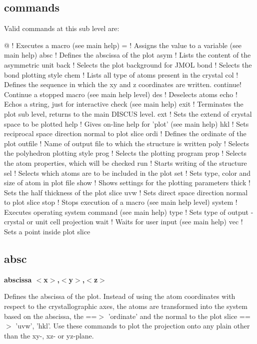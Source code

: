 \subsection*{commands}
Valid commands at this sub level are: 
\par
\begin{MacVerbatim}
@       ! Executes a macro (see main help)
=       ! Assigns the value to a variable (see main help)
absc    ! Defines the abscissa of the plot
asym    ! Lists the content of the asymmetric unit
back    ! Selects the plot background for JMOL
bond    ! Selects the bond plotting style
chem    ! Lists all type of atoms present in the crystal
col     ! Defines the sequence in which the xy and z coordinates are written.
continue! Continue a stopped macro (see main help level)
des     ! Deselects atoms
echo    ! Echos a string, just for interactive check (see main help)
exit    ! Terminates the plot sub level, returns to the main DISCUS level.
ext     ! Sets the extend of crystal space to be plotted
help    ! Gives on-line help for 'plot' (see main help)
hkl     ! Sets reciprocal space direction normal to plot slice
ordi    ! Defines the ordinate of the plot
outfile ! Name of output file to which the structure is written
poly    ! Selects the polyhedron plotting style
prog    ! Selects the plotting program
prop    ! Selects the atom properties, which will be checked
run     ! Starts writing of the structure
sel     ! Selects which atoms are to be included in the plot
set     ! Sets type, color and size of atom in plot file
show    ! Shows settings for the plotting parameters
thick   ! Sets the half thickness of the plot slice
uvw     ! Sets direct space direction normal to plot slice
stop    ! Stops execution of a macro (see main help level)
system  ! Executes operating system command (see main help)
type    ! Sets type of output - crystal or unit cell projection
wait    ! Waits for user input (see main help)
vec     ! Sets a point inside plot slice
\end{MacVerbatim}
\subsection*{absc}
{\bf abscissa $ <$x$> $,$ <$y$> $,$ <$z$> $ \par }
\par
\vspace{3pt}
Defines the abscissa of the plot. 
Instead of using the atom coordinates with respect to the crystallographic 
axes, the atoms are transformed into the system based on the abscissa, 
the ==$> $ 'ordinate' and the normal to the plot slice ==$> $ 'uvw', 'hkl'. 
Use these commands to plot the projection onto any plain other than the 
xy-, xz- or yz-plane. 
